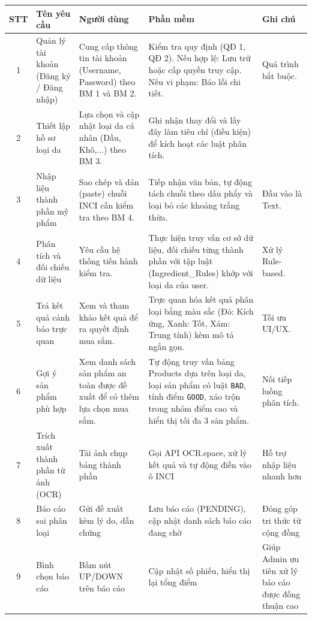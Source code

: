 \documentclass[12pt,a4paper]{article}
\begin{document}
\begin{center}
\begin{tabular}{|c|p{3.5cm}|p{4cm}|p{4.5cm}|p{2cm}|}
\hline
\textbf{STT} & \textbf{Tên yêu cầu} & \textbf{Người dùng} & \textbf{Phần mềm} & \textbf{Ghi chú} \\
\hline
1 & Quản lý tài khoản (Đăng ký / Đăng nhập) & Cung cấp thông tin tài khoản (Username, Password) theo BM 1 và BM 2. & Kiểm tra quy định (QĐ 1, QĐ 2). Nếu hợp lệ: Lưu trữ hoặc cấp quyền truy cập. Nếu vi phạm: Báo lỗi chi tiết. & Quá trình bắt buộc. \\
\hline
2 & Thiết lập hồ sơ loại da & Lựa chọn và cập nhật loại da cá nhân (Dầu, Khô,...) theo BM 3. & Ghi nhận thay đổi và lấy đây làm tiêu chí (điều kiện) để kích hoạt các luật phân tích. & \\
\hline
3 & Nhập liệu thành phần mỹ phẩm & Sao chép và dán (paste) chuỗi INCI cần kiểm tra theo BM 4. & Tiếp nhận văn bản, tự động tách chuỗi theo dấu phẩy và loại bỏ các khoảng trắng thừa. & Đầu vào là Text. \\
\hline
4 & Phân tích và đối chiếu dữ liệu & Yêu cầu hệ thống tiến hành kiểm tra. & Thực hiện truy vấn cơ sở dữ liệu, đối chiếu từng thành phần với tập luật (Ingredient\_Rules) khớp với loại da của user. & Xử lý Rule-based. \\
\hline
5 & Trả kết quả cảnh báo trực quan & Xem và tham khảo kết quả để ra quyết định mua sắm. & Trực quan hóa kết quả phân loại bằng màu sắc (Đỏ: Kích ứng, Xanh: Tốt, Xám: Trung tính) kèm mô tả ngắn gọn. & Tối ưu UI/UX. \\
\hline
6 & Gợi ý sản phẩm phù hợp & Xem danh sách sản phẩm an toàn được đề xuất để có thêm lựa chọn mua sắm. & Tự động truy vấn bảng Products dựa trên loại da, loại sản phẩm có luật \texttt{BAD}, tính điểm \texttt{GOOD}, xáo trộn trong nhóm điểm cao và hiển thị tối đa 3 sản phẩm. & Nối tiếp luồng phân tích. \\
\hline
7 & Trích xuất thành phần từ ảnh (OCR) & Tải ảnh chụp bảng thành phần & Gọi API OCR.space, xử lý kết quả và tự động điền vào ô INCI & Hỗ trợ nhập liệu nhanh hơn \\
\hline
8 & Báo cáo sai phân loại & Gửi đề xuất kèm lý do, dẫn chứng & Lưu báo cáo (PENDING), cập nhật danh sách báo cáo đang chờ & Đóng góp tri thức từ cộng đồng \\
\hline
9 & Bình chọn báo cáo & Bấm nút UP/DOWN trên báo cáo & Cập nhật số phiếu, hiển thị lại tổng điểm & Giúp Admin ưu tiên xử lý báo cáo được đồng thuận cao \\
\hline
\end{tabular}
\end{center}
\end{document}

